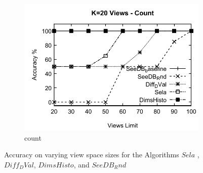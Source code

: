 \begin{figure}[h]
\begin{subfigure}[b]{0.32\textwidth}
    \includegraphics[width=\textwidth]{CountA2.pdf}
     \caption{count}
        \label{fig:CountA2}
  \end{subfigure}
  \caption{Accuracy on varying view space sizes for the Algorithms $Sela$ ,$Diff_DVal$, $DimsHisto$, and $SeeDB_Rnd$}
\end{figure}

